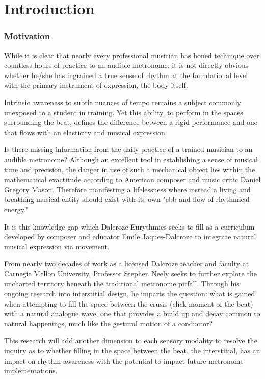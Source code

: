 
\chapter{Introduction} \label{secIntro}
\subsection{Motivation}
While it is clear that nearly every professional musician has honed technique over countless hours of practice to an audible metronome, it is not directly obvious whether he/she has ingrained a true sense of rhythm at the foundational level with the primary instrument of expression, the body itself.

Intrinsic awareness to subtle nuances of tempo remains a subject commonly unexposed to a student in training. Yet this ability, to perform in the spaces surrounding the beat, defines the difference between a rigid performance and one that flows with an elasticity and musical expression.

Is there missing information from the daily practice of a trained musician to an audible metronome? Although an excellent tool in establishing a sense of musical time and precision, the danger in use of such a mechanical object lies within the mathematical exactitude according to American composer and music critic Daniel Gregory Mason. Therefore manifesting a lifelessness where instead a living and breathing musical entity should exist with its own "ebb and flow of rhythmical energy."\cite{fitts2008new}

It is this knowledge gap which Dalcroze Eurythmics seeks to fill as a curriculum developed by composer and educator Emile Jaques-Dalcroze to integrate natural musical expression via movement.  

From nearly two decades of work as a licensed Dalcroze teacher and faculty at Carnegie Mellon University, Professor Stephen Neely seeks to further explore the uncharted territory beneath the traditional metronome pitfall. Through his ongoing research into interstitial design, he imparts the question: what is gained when attempting to fill the space between the crusis (click moment of the beat) with a natural analogue wave, one that provides a build up and decay common to natural happenings, much like the gestural motion of a conductor?

This research will add another dimension to each sensory modality to resolve the inquiry as to whether filling in the space between the beat, the interstitial, has an impact on rhythm awareness with the potential to impact future metronome implementations. 

